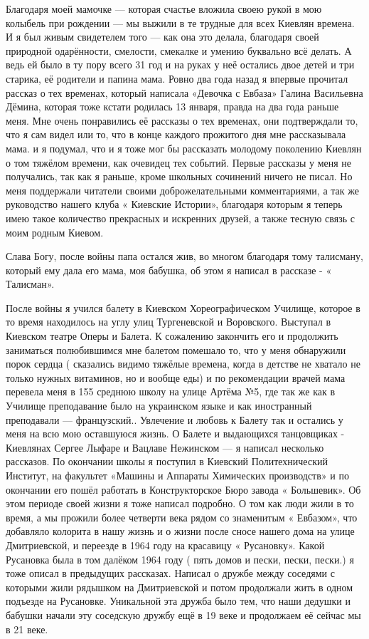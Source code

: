 Благодаря моей мамочке — которая счастье вложила своею рукой в мою колыбель при
рождении — мы выжили в те трудные для всех Киевлян времена.  И я был живым
свидетелем того — как она это делала, благодаря своей природной одарённости,
смелости, смекалке и умению  буквально всё делать. А ведь ей было  в ту пору
всего 31 год и на руках у неё остались двое детей и три старика, её родители и
папина мама. Ровно два года назад я впервые прочитал рассказ о тех временах,
который написала «Девочка с Евбаза» Галина Васильевна  Дёмина, которая тоже
кстати родилась 13 января, правда на два года раньше меня. Мне очень
понравились её рассказы  о тех временах, они подтверждали то, что я сам видел
или то, что в конце каждого прожитого дня мне рассказывала мама. и я подумал,
что и я  тоже мог бы  рассказать молодому поколению Киевлян  о том тяжёлом
времени, как очевидец тех событий. Первые рассказы у меня не получались,  так
как я раньше, кроме школьных сочинений ничего не писал. Но меня поддержали
читатели  своими доброжелательными комментариями, а так же руководство нашего
клуба « Киевские Истории», благодаря которым я теперь имею такое количество
прекрасных и искренних  друзей, а также тесную  связь с моим родным Киевом.

Слава Богу, после войны папа остался жив, во многом благодаря тому талисману,
который ему дала его мама, моя бабушка, об этом я  написал в рассказе - «
Талисман».

После войны я учился балету в Киевском Хореографическом Училище, которое в то
время находилось на углу улиц Тургеневской и Воровского. Выступал в Киевском
театре Оперы и Балета. К сожалению закончить его и продолжить заниматься
полюбившимся мне балетом  помешало то, что у меня обнаружили порок сердца (
сказались видимо тяжёлые времена, когда в детстве не хватало не только нужных
витаминов, но и вообще еды) и по рекомендации врачей мама перевела меня в 155
среднюю школу на улице Артёма №5, где так же как в Училище преподавание было на
украинском языке и  как иностранный преподавали — французский.. Увлечение и
любовь к Балету так и остались у меня  на всю мою оставшуюся жизнь. О Балете и
выдающихся танцовщиках  -  Киевлянах Сергее Лыфаре и Вацлаве Нежинском — я
написал несколько рассказов. По окончании школы я поступил в Киевский
Политехнический Институт, на факультет  «Машины и Аппараты Химических
производств»  и  по окончании его  пошёл работать в Конструкторское Бюро завода
« Большевик».  Об этом периоде своей жизни я тоже написал  подробно.  О том как
люди жили в то время, а мы прожили  более четверти века рядом со знаменитым «
Евбазом», что добавляло колорита в  нашу жизнь  и о жизни  после  сносе нашего
дома на улице  Дмитриевской, и  переезде в 1964 году на  красавицу «
Русановку».  Какой  Русановка  была в том далёком 1964  году  ( пять домов и
пески, пески, пески.) я тоже описал в предыдущих рассказах. Написал о  дружбе
между соседями с которыми жили рядышком на Дмитриевской и  потом продолжали
жить в одном подъезде на Русановке.  Уникальной эта дружба было тем, что наши
дедушки и бабушки начали эту соседскую дружбу ещё в 19 веке и продолжаем её
сейчас мы в 21 веке.

